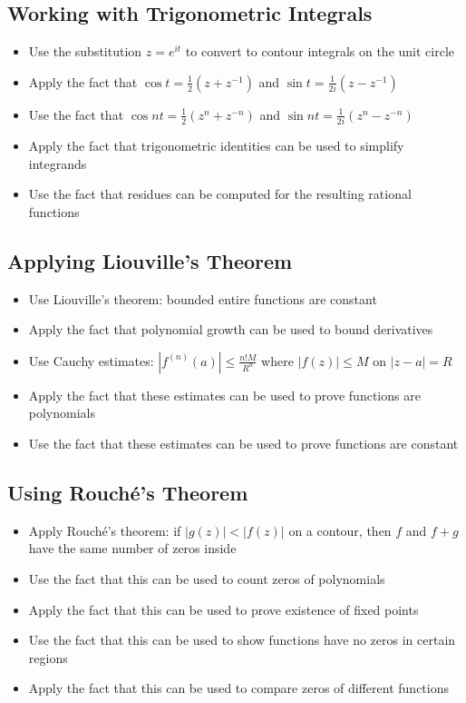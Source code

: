 \subsection*{Working with Trigonometric Integrals}
\begin{itemize}
\item Use the substitution $z = e^{it}$ to convert to contour integrals on the unit circle
\item Apply the fact that $\cos t = \frac{1}{2}(z + z^{-1})$ and $\sin t = \frac{1}{2i}(z - z^{-1})$
\item Use the fact that $\cos nt = \frac{1}{2}(z^n + z^{-n})$ and $\sin nt = \frac{1}{2i}(z^n - z^{-n})$
\item Apply the fact that trigonometric identities can be used to simplify integrands
\item Use the fact that residues can be computed for the resulting rational functions
\end{itemize}

\subsection*{Applying Liouville's Theorem}
\begin{itemize}
\item Use Liouville's theorem: bounded entire functions are constant
\item Apply the fact that polynomial growth can be used to bound derivatives
\item Use Cauchy estimates: $|f^{(n)}(a)| \leq \frac{n! M}{R^n}$ where $|f(z)| \leq M$ on $|z-a| = R$
\item Apply the fact that these estimates can be used to prove functions are polynomials
\item Use the fact that these estimates can be used to prove functions are constant
\end{itemize}

\subsection*{Using Rouché's Theorem}
\begin{itemize}
\item Apply Rouché's theorem: if $|g(z)| < |f(z)|$ on a contour, then $f$ and $f+g$ have the same number of zeros inside
\item Use the fact that this can be used to count zeros of polynomials
\item Apply the fact that this can be used to prove existence of fixed points
\item Use the fact that this can be used to show functions have no zeros in certain regions
\item Apply the fact that this can be used to compare zeros of different functions
\end{itemize}

